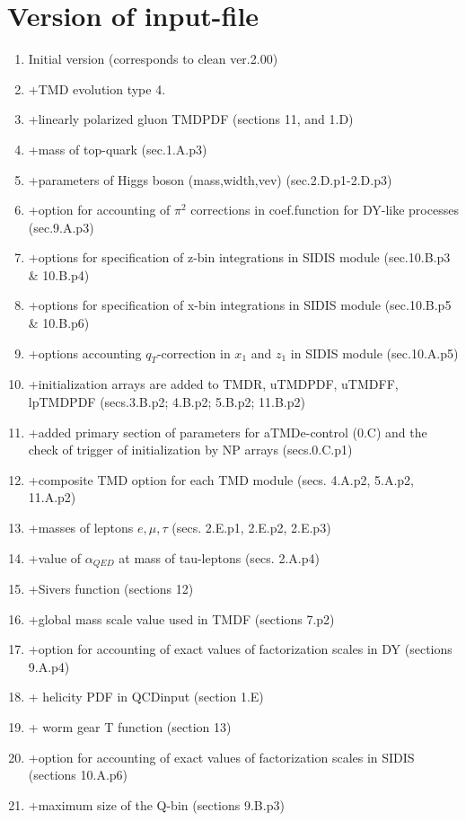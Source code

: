 \documentclass[prd,nofootinbib,eqsecnum,final]{revtex4}
\renewcommand{\(}{\left(}
\renewcommand{\)}{\right)}
\renewcommand{\[}{\left[}
\renewcommand{\]}{\right]}
\begin{document}
\section{Version of input-file}
\begin{enumerate}
\item Initial version (corresponds to clean ver.2.00)
\item +TMD evolution type 4.
\item +linearly polarized gluon TMDPDF (sections 11, and 1.D)
\item +mass of top-quark (sec.1.A.p3)
\item +parameters of Higgs boson (mass,width,vev) (sec.2.D.p1-2.D.p3)
\item +option for accounting of $\pi^2$ corrections in coef.function for DY-like processes (sec.9.A.p3)
\item +options for specification of z-bin integrations in SIDIS module (sec.10.B.p3 \& 10.B.p4)
\item +options for specification of x-bin integrations in SIDIS module (sec.10.B.p5 \& 10.B.p6)
\item +options accounting $q_T$-correction in $x_1$ and $z_1$ in SIDIS module (sec.10.A.p5)
\item +initialization arrays are added to TMDR, uTMDPDF, uTMDFF, lpTMDPDF (secs.3.B.p2; 4.B.p2; 5.B.p2; 11.B.p2)
\item +added primary section of parameters for aTMDe-control (0.C) and the check of trigger of initialization by NP arrays (secs.0.C.p1)
\item +composite TMD option for each TMD module (secs. 4.A.p2, 5.A.p2, 11.A.p2)
\item +masses of leptons $e,\mu,\tau$ (secs. 2.E.p1, 2.E.p2, 2.E.p3)
\item +value of $\alpha_{QED}$ at mass of tau-leptons (secs. 2.A.p4)
\item +Sivers function (sections 12)
\item +global mass scale value used in TMDF (sections 7.p2)
\item +option for accounting of exact values of factorization scales in DY (sections 9.A.p4)
\item + helicity PDF in QCDinput (section 1.E)
\item + worm gear T function (section 13)
\item +option for accounting of exact values of factorization scales in SIDIS (sections 10.A.p6)
\item +maximum size of the Q-bin (sections 9.B.p3)
\end{enumerate}
\end{document}
